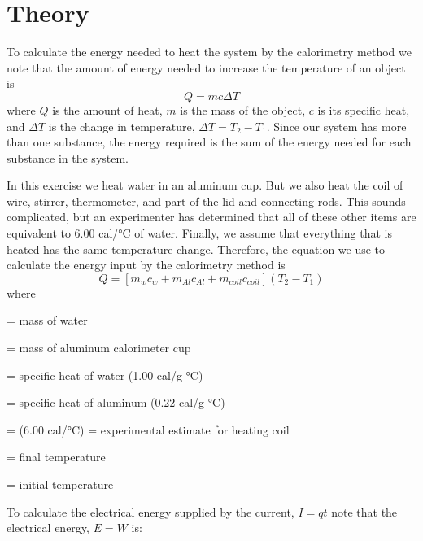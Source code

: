 \section{Theory}
To calculate the energy needed to heat the system by the calorimetry method we note that the amount of energy needed to increase the temperature of an object is
\begin{equation} \label{e:qheat1}
	Q = mc\Delta T 
\end{equation}
where $Q$ is the amount of heat, $m$ is the mass of the object, $c$ is its specific heat, and $\Delta T$ is the change in temperature, $\Delta T =T_2 - T_1$.  Since our system has more than one substance, the energy required is the sum of the energy needed for each substance in the system.

In this exercise we heat water in an aluminum cup.  But we also heat the coil of wire, stirrer, thermometer, and part of the lid and connecting rods.  This sounds complicated, but an experimenter has determined that all of these other items are equivalent to 6.00 cal/\si{\degree}C of water. Finally, we assume that everything that is heated has the same temperature change.  Therefore, the equation we use to calculate the energy input by the calorimetry method is
\begin{equation}\label{e:qheat2}
	Q = [m_wc_w + m_{Al}c_{Al} + m_{coil}c_{coil}](T_2 - T_1)
\end{equation}
where	
\begin{description}[itemsep=1pt]
	\item [$m_w$] = mass of water
	\item [$m_{Al}$]	= mass of aluminum calorimeter cup
	\item [$c_w$]	= specific heat of water (1.00 cal/g \si{\degree}C)
	\item [$c_{Al}$]	= specific heat of aluminum (0.22 cal/g \si{\degree}C)
	\item [$m_{coil}c_{coil}$] = (6.00 cal/\si{\degree}C) = experimental estimate for heating coil
	\item [$T_2$]	= final temperature
	\item [$T_1$]	= initial temperature
\end{description}

To calculate the electrical energy supplied by the current, $I=q t$ note that the electrical energy, $E = W$ is: %

